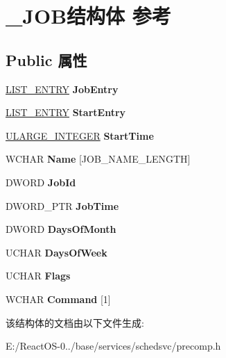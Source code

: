 \hypertarget{struct___j_o_b}{}\section{\+\_\+\+J\+O\+B结构体 参考}
\label{struct___j_o_b}
\subsection*{Public 属性}
\begin{DoxyCompactItemize}
\item 
\mbox{\label{struct___j_o_b_a3a9f10411c775f18525608093d0e4955}} 
\hyperlink{struct___l_i_s_t___e_n_t_r_y}{L\+I\+S\+T\+\_\+\+E\+N\+T\+RY} {\bfseries Job\+Entry}
\item 
\mbox{\label{struct___j_o_b_a321d10ae79c22ae34313811c93c125fc}} 
\hyperlink{struct___l_i_s_t___e_n_t_r_y}{L\+I\+S\+T\+\_\+\+E\+N\+T\+RY} {\bfseries Start\+Entry}
\item 
\mbox{\label{struct___j_o_b_a5d36ec6446e9de8438dda74d86a1a30c}} 
\hyperlink{struct___u_l_a_r_g_e___i_n_t_e_g_e_r}{U\+L\+A\+R\+G\+E\+\_\+\+I\+N\+T\+E\+G\+ER} {\bfseries Start\+Time}
\item 
\mbox{\label{struct___j_o_b_a6073661506949edcfa9d95190c683659}} 
W\+C\+H\+AR {\bfseries Name} \mbox{[}J\+O\+B\+\_\+\+N\+A\+M\+E\+\_\+\+L\+E\+N\+G\+TH\mbox{]}
\item 
\mbox{\label{struct___j_o_b_aecd1e5d49aed065fd9f2d34780212497}} 
D\+W\+O\+RD {\bfseries Job\+Id}
\item 
\mbox{\label{struct___j_o_b_aa5b285685736d2d8717fcd0a7118d58a}} 
D\+W\+O\+R\+D\+\_\+\+P\+TR {\bfseries Job\+Time}
\item 
\mbox{\label{struct___j_o_b_ab82bb07cfecb8dc0892caee836ab7431}} 
D\+W\+O\+RD {\bfseries Days\+Of\+Month}
\item 
\mbox{\label{struct___j_o_b_a243b404d4322941f6f79ffbc9d588b26}} 
U\+C\+H\+AR {\bfseries Days\+Of\+Week}
\item 
\mbox{\label{struct___j_o_b_a2a30af3d218038cdf8a2cee375608ed7}} 
U\+C\+H\+AR {\bfseries Flags}
\item 
\mbox{\label{struct___j_o_b_a7f9fc1aff09679e8c131893f8f82802b}} 
W\+C\+H\+AR {\bfseries Command} \mbox{[}1\mbox{]}
\end{DoxyCompactItemize}


该结构体的文档由以下文件生成\+:\begin{DoxyCompactItemize}
\item 
E\+:/\+React\+O\+S-\/0../base/services/schedsvc/precomp.\+h\end{DoxyCompactItemize}
